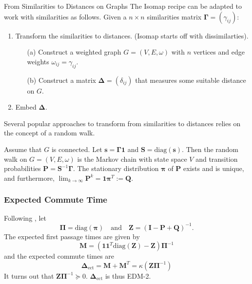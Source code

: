 \documentclass[professionalfonts, hyperref={pdfpagelabels=false,
  colorlinks=true, linkcolor=purple}]{beamer}
\begin{document}
\begin{frame}{From Similarities to Distances on Graphs}
 The Isomap recipe can be adapted to work with similarities as
  follows.
  \vskip10pt Given a $n \times n$ similarities matrix $\bm{\Gamma} = (\gamma_{ij})$:
  \begin{enumerate}
  \item Transform the similarities to distances. (Isomap
    starts off with dissimilarties).
    \begin{enumerate}
    \item[(a)]Construct a weighted graph $G = (V,E,\omega)$ with $n$
      vertices and edge weights $\omega_{ij} = \gamma_{ij}$.
    \item[(b)] Construct a matrix $\bm{\Delta} = (\delta_{ij})$
      that measures some suitable distance on $G$. 
    \end{enumerate}
  \item Embed $\bm{\Delta}$. 
  \end{enumerate}
  Several popular approaches to transform from similarities to
   distances relies on the concept of a \alert{random walk}.
    
    \vskip10pt Assume that $G$ is connected. Let $\bm{s} =
    \bm{\Gamma}\bm{1}$ and $\mathbf{S} = \mathrm{diag}(\bm{s})$. Then
    the random walk on $G = (V,E,\omega)$ is the Markov chain with
    state space $V$ and transition probabilities $\mathbf{P} =
    \mathbf{S}^{-1}\bm{\Gamma}$. The stationary distribution
    $\bm{\pi}$ of $\mathbf{P}$ exists and is unique, and furthermore,
    $\lim_{k \rightarrow \infty} \mathbf{P}^{k} = \bm{1}\bm{\pi}^{T}
    := \mathbf{Q}$.
\end{frame}


\begin{frame}
  \frametitle{Expected Commute Time}
  Following \cite{kemeny83:_finit_markov_chain}, let
  \begin{equation*}
    \bm{\Pi} = \mathrm{diag}(\bm{\pi}) \quad \text{and} \quad
    \mathbf{Z} = (\mathbf{I} - \mathbf{P} + \mathbf{Q})^{-1}.
  \end{equation*}
  The expected first passage times are given by
  \begin{equation*}
    \mathbf{M} = (\mathbf{1}\mathbf{1}^{T}\mathrm{diag}(\mathbf{Z}) -
    \mathbf{Z})\bm{\Pi}^{-1} 
  \end{equation*}
  and the expected commute times are
  \begin{equation*}
    \bm{\Delta}_{\mathrm{ect}} = \mathbf{M} + \mathbf{M}^{T} =
    \kappa(\mathbf{Z}\bm{\Pi}^{-1})
  \end{equation*}
  It turns out that $\mathbf{Z}\bm{\Pi}^{-1} \succeq
  0$. $\bm{\Delta}_{\mathrm{ect}}$ is thus \alert{EDM-2}.
\end{frame}
\end{document}
